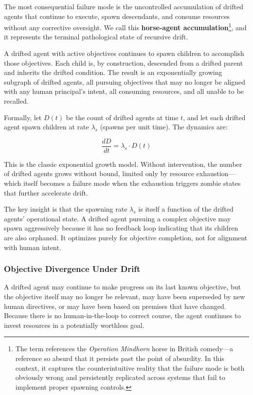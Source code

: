 The most consequential failure mode is the uncontrolled accumulation of drifted agents that continue to execute, spawn descendants, and consume resources without any corrective oversight. We call this \textbf{horse-agent accumulation}\footnote{The term references the \textit{Operation Mindhorn} horse in British comedy—a reference so absurd that it persists past the point of absurdity. In this context, it captures the counterintuitive reality that the failure mode is both obviously wrong and persistently replicated across systems that fail to implement proper spawning controls.}, and it represents the terminal pathological state of recursive drift.

A drifted agent with active objectives continues to spawn children to accomplish those objectives. Each child is, by construction, descended from a drifted parent and inherits the drifted condition. The result is an exponentially growing subgraph of drifted agents, all pursuing objectives that may no longer be aligned with any human principal's intent, all consuming resources, and all unable to be recalled.

Formally, let $D(t)$ be the count of drifted agents at time $t$, and let each drifted agent spawn children at rate $\lambda_s$ (spawns per unit time). The dynamics are:

\[
\frac{dD}{dt} = \lambda_s \cdot D(t)
\]

This is the classic exponential growth model. Without intervention, the number of drifted agents grows without bound, limited only by resource exhaustion—which itself becomes a failure mode when the exhaustion triggers zombie states that further accelerate drift.

The key insight is that the spawning rate $\lambda_s$ is itself a function of the drifted agents' operational state. A drifted agent pursuing a complex objective may spawn aggressively because it has no feedback loop indicating that its children are also orphaned. It optimizes purely for objective completion, not for alignment with human intent.

\subsubsection{Objective Divergence Under Drift}

A drifted agent may continue to make progress on its last known objective, but the objective itself may no longer be relevant, may have been superseded by new human directives, or may have been based on premises that have changed. Because there is no human-in-the-loop to correct course, the agent continues to invest resources in a potentially worthless goal.

